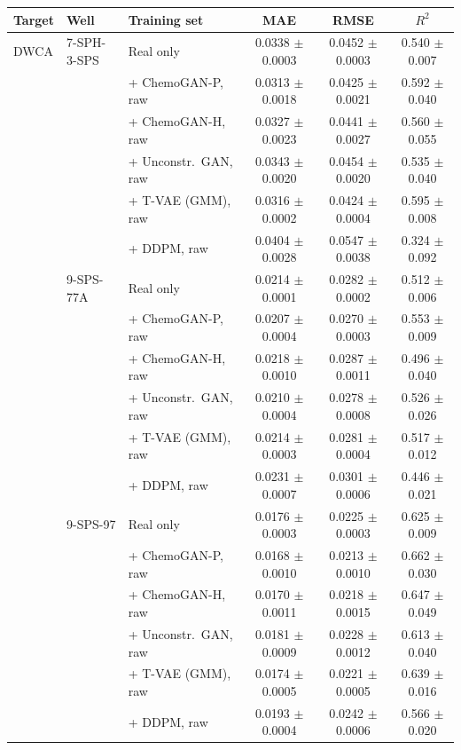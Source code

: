 \begin{tabular}{lllccc}
\hline
\textbf{Target} & \textbf{Well} & \textbf{Training set} & \textbf{MAE} & \textbf{RMSE} & \textbf{$R^2$} \\ \hline
DWCA & 7-SPH-3-SPS & Real only & 0.0338 $\pm$ 0.0003 & 0.0452 $\pm$ 0.0003 & 0.540 $\pm$ 0.007 \\
 &  & + ChemoGAN-P, raw & 0.0313 $\pm$ 0.0018 & 0.0425 $\pm$ 0.0021 & 0.592 $\pm$ 0.040 \\
 &  & + ChemoGAN-H, raw & 0.0327 $\pm$ 0.0023 & 0.0441 $\pm$ 0.0027 & 0.560 $\pm$ 0.055 \\
 &  & + Unconstr.\ GAN, raw & 0.0343 $\pm$ 0.0020 & 0.0454 $\pm$ 0.0020 & 0.535 $\pm$ 0.040 \\
 &  & + T-VAE (GMM), raw & 0.0316 $\pm$ 0.0002 & 0.0424 $\pm$ 0.0004 & 0.595 $\pm$ 0.008 \\
 &  & + DDPM, raw & 0.0404 $\pm$ 0.0028 & 0.0547 $\pm$ 0.0038 & 0.324 $\pm$ 0.092 \\
\hline
 & 9-SPS-77A & Real only & 0.0214 $\pm$ 0.0001 & 0.0282 $\pm$ 0.0002 & 0.512 $\pm$ 0.006 \\
 &  & + ChemoGAN-P, raw & 0.0207 $\pm$ 0.0004 & 0.0270 $\pm$ 0.0003 & 0.553 $\pm$ 0.009 \\
 &  & + ChemoGAN-H, raw & 0.0218 $\pm$ 0.0010 & 0.0287 $\pm$ 0.0011 & 0.496 $\pm$ 0.040 \\
 &  & + Unconstr.\ GAN, raw & 0.0210 $\pm$ 0.0004 & 0.0278 $\pm$ 0.0008 & 0.526 $\pm$ 0.026 \\
 &  & + T-VAE (GMM), raw & 0.0214 $\pm$ 0.0003 & 0.0281 $\pm$ 0.0004 & 0.517 $\pm$ 0.012 \\
 &  & + DDPM, raw & 0.0231 $\pm$ 0.0007 & 0.0301 $\pm$ 0.0006 & 0.446 $\pm$ 0.021 \\
\hline
 & 9-SPS-97 & Real only & 0.0176 $\pm$ 0.0003 & 0.0225 $\pm$ 0.0003 & 0.625 $\pm$ 0.009 \\
 &  & + ChemoGAN-P, raw & 0.0168 $\pm$ 0.0010 & 0.0213 $\pm$ 0.0010 & 0.662 $\pm$ 0.030 \\
 &  & + ChemoGAN-H, raw & 0.0170 $\pm$ 0.0011 & 0.0218 $\pm$ 0.0015 & 0.647 $\pm$ 0.049 \\
 &  & + Unconstr.\ GAN, raw & 0.0181 $\pm$ 0.0009 & 0.0228 $\pm$ 0.0012 & 0.613 $\pm$ 0.040 \\
 &  & + T-VAE (GMM), raw & 0.0174 $\pm$ 0.0005 & 0.0221 $\pm$ 0.0005 & 0.639 $\pm$ 0.016 \\
 &  & + DDPM, raw & 0.0193 $\pm$ 0.0004 & 0.0242 $\pm$ 0.0006 & 0.566 $\pm$ 0.020 \\

\end{tabular}
